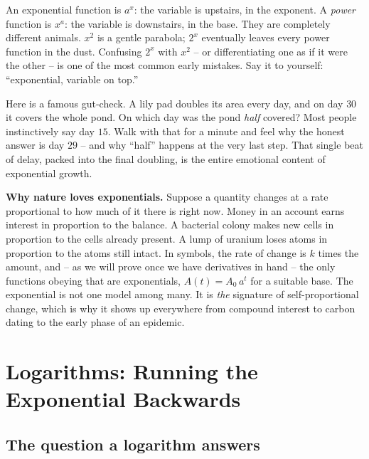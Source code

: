 \begin{trapbox}
An exponential function is $a^x$: the variable is upstairs, in the exponent. A \emph{power} function is $x^a$: the variable is downstairs, in the base. They are completely different animals. $x^2$ is a gentle parabola; $2^x$ eventually leaves every power function in the dust. Confusing $2^x$ with $x^2$ -- or differentiating one as if it were the other -- is one of the most common early mistakes. Say it to yourself: ``exponential, variable on top.''
\end{trapbox}

\begin{walkbox}
Here is a famous gut-check. A lily pad doubles its area every day, and on day $30$ it covers the whole pond. On which day was the pond \emph{half} covered? Most people instinctively say day $15$. Walk with that for a minute and feel why the honest answer is day $29$ -- and why ``half'' happens at the very last step. That single beat of delay, packed into the final doubling, is the entire emotional content of exponential growth.
\end{walkbox}

\begin{applicationbox}
\textbf{Why nature loves exponentials.} Suppose a quantity changes at a rate proportional to how much of it there is right now. Money in an account earns interest in proportion to the balance. A bacterial colony makes new cells in proportion to the cells already present. A lump of uranium loses atoms in proportion to the atoms still intact. In symbols, the rate of change is $k$ times the amount, and -- as we will prove once we have derivatives in hand -- the only functions obeying that are exponentials, $A(t)=A_0\, a^{t}$ for a suitable base. The exponential is not one model among many. It is \emph{the} signature of self-proportional change, which is why it shows up everywhere from compound interest to carbon dating to the early phase of an epidemic.
\end{applicationbox}

\section{Logarithms: Running the Exponential Backwards}

\subsection{The question a logarithm answers}

